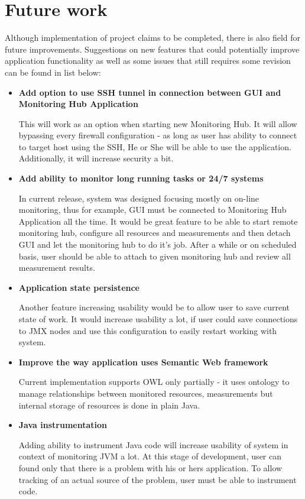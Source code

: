 %


\section{Future work}
\label{sec:ch8_future_work}
 
Although implementation of project claims to be completed, there is also field for future improvements. Suggestions on new features that could potentially improve application functionality as well as some issues that still requires some revision can be found in list below:

\begin{itemize}
 \item {\bf Add option to use SSH tunnel in connection between GUI and Monitoring Hub Application}
 
 This will work as an option when starting new Monitoring Hub. It will allow bypassing every firewall configuration - as long as user has ability to connect to target host using the SSH, He or She will be able to use the application. Additionally, it will increase security a bit.
 
\item {\bf Add ability to monitor long running tasks or 24/7 systems }  

In current release, system was designed focusing mostly on on-line monitoring, thus for example, GUI must be connected to Monitoring Hub Application all the time. It would be great feature to be able to start remote monitoring hub, configure all resources and measurements and then detach GUI and let the monitoring hub to do it\rq{}s job. After a while or on scheduled basis, user should be able to attach to given monitoring hub and review all measurement results.

\item {\bf Application state persistence }  

Another feature increasing usability would be to allow user to save current state of work. It would increase usability a lot, if user could save connections to JMX nodes and use this configuration to easily restart working with system. 

 \item {\bf Improve the way application uses Semantic Web framework} 
     
Current implementation supports OWL only partially - it uses ontology to manage relationships between monitored resources, measurements but internal storage of resources is done in plain Java.
          
\item {\bf Java instrumentation}

Adding ability to instrument Java code will increase usability of system in context of monitoring JVM a lot. At this stage of development, user can found only that there is a problem with his or hers application. To allow tracking of an actual source of the problem, user must be able to instrument code.      
      
\end{itemize}